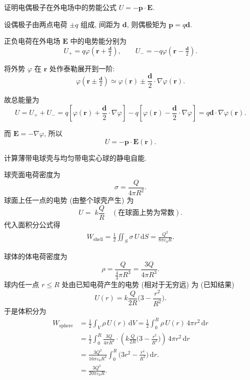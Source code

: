 \begin{example}
证明电偶极子在外电场中的势能公式 \(U=-\mathbf{p}\cdot\mathbf{E}\).

设偶极子由两点电荷 \(\pm q\) 组成, 间距为 \(\mathbf{d}\), 则偶极矩为
\(\mathbf{p}=q\mathbf{d}\).

正负电荷在外电场 \(\mathbf{E}\) 中的电势能分别为
\[
U_{+}=q\varphi(\mathbf{r}+\tfrac{\mathbf{d}}{2}),\qquad
U_{-}=-q\varphi(\mathbf{r}-\tfrac{\mathbf{d}}{2}).
\]

将外势 \(\varphi\) 在 \(\mathbf{r}\) 处作泰勒展开到一阶:
\[
\varphi(\mathbf{r}\pm\tfrac{\mathbf{d}}{2})
\simeq \varphi(\mathbf{r})\pm \frac{\mathbf{d}}{2}\cdot\nabla\varphi(\mathbf{r}).
\]

故总能量为
\[
U=U_{+}+U_{-}
= q\left[\varphi(\mathbf{r})+\frac{\mathbf{d}}{2}\cdot\nabla\varphi\right]
-q\left[\varphi(\mathbf{r})-\frac{\mathbf{d}}{2}\cdot\nabla\varphi\right]
= q\mathbf{d}\cdot\nabla\varphi(\mathbf{r}).
\]

而 \(\mathbf{E}=-\nabla\varphi\), 所以
\[
\boxed{U=-\mathbf{p}\cdot\mathbf{E}(\mathbf{r})}.
\]
\end{example}


\begin{example}
计算薄带电球壳与均匀带电实心球的静电自能.

球壳面电荷密度为
\[
\sigma=\frac{Q}{4\pi R^2}.
\]
球面上任一点的电势 (由整个球壳产生) 为
\[
U=\;k\frac{Q}{R}\quad(\text{在球面上势为常数}).
\]
代入面积分公式得
\[
\begin{aligned}
W_{\mathrm{shell}}=\tfrac{1}{2}\iint_{S}\sigma\,U\,\mathrm{d}S
= \frac{Q^2}{8\pi\varepsilon_0 R}.
\end{aligned}
\]
\end{example}

球体的体电荷密度为
\[
\rho=\frac{Q}{\tfrac{4}{3}\pi R^3}=\frac{3Q}{4\pi R^3}.
\]
球内任一点 \(r\le R\) 处由已知电荷产生的电势 (相对于无穷远) 为 (已知结果)
\[
U(r)=k\frac{Q}{2R}\Big(3-\frac{r^2}{R^2}\Big).
\]
于是体积分为
\[
\begin{aligned}
W_{\mathrm{sphere}}
&=\tfrac{1}{2}\int_{V}\rho\,U(r)\,\mathrm{d}V
=\tfrac{1}{2}\int_{0}^{R}\rho\,U(r)\,4\pi r^2\,\mathrm{d}r \\
&=\tfrac{1}{2}\int_{0}^{R}\frac{3Q}{4\pi R^3}\cdot
\left(k\frac{Q}{2R}\Big(3-\frac{r^2}{R^2}\Big)\right)\,4\pi r^2\,\mathrm{d}r \\
&= \frac{3Q^2}{16\pi\varepsilon_0R^4}
\int_{0}^{R}\big(3r^2-\frac{r^4}{R^2}\big)\,\mathrm{d}r. \\
&= \frac{3Q^2}{20\pi\varepsilon_0 R}.
\end{aligned}
\]

